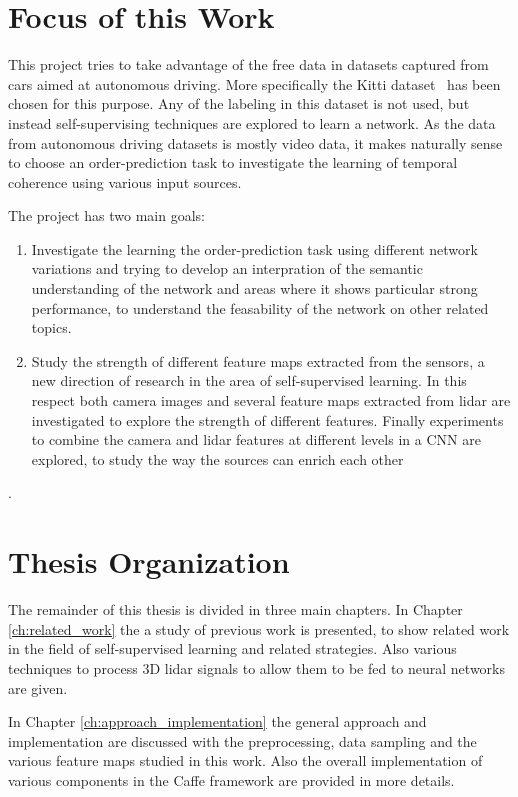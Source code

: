 \section{Focus of this Work}
This project tries to take advantage of the free data in datasets captured from cars aimed at autonomous driving. More specifically the Kitti dataset~\cite{geiger2012} has been chosen for this purpose. Any of the labeling in this dataset is not used, but instead self-supervising techniques are explored to learn a network. As the data from autonomous driving datasets is mostly video data, it makes naturally sense to choose an order-prediction task to investigate the learning of temporal coherence using various input sources.

The project has two main goals:
\begin{enumerate}
\item Investigate the learning the order-prediction task using different network variations and trying to develop an interpration of the semantic understanding of the network and areas where it shows particular strong performance, to understand the feasability of the network on other related topics.
\item Study the strength of different feature maps extracted from the sensors, a new direction of research in the area of self-supervised learning. In this respect both camera images and several feature maps extracted from lidar are investigated to explore the strength of different features. Finally experiments to combine the camera and lidar features at different levels in a CNN are explored, to study the way the sources can enrich each other
\end{enumerate}.

\section{Thesis Organization}
The remainder of this thesis is divided in three main chapters. In Chapter \ref{ch:related_work} the a study of previous work is presented, to show related work in the field of self-supervised learning and related strategies. Also various techniques to process 3D lidar signals to allow them to be fed to neural networks are given. 

In Chapter \ref{ch:approach_implementation} the general approach and implementation are discussed with the preprocessing, data sampling and the various feature maps studied in this work. Also the overall implementation of various components in the Caffe framework are provided in more details. 

